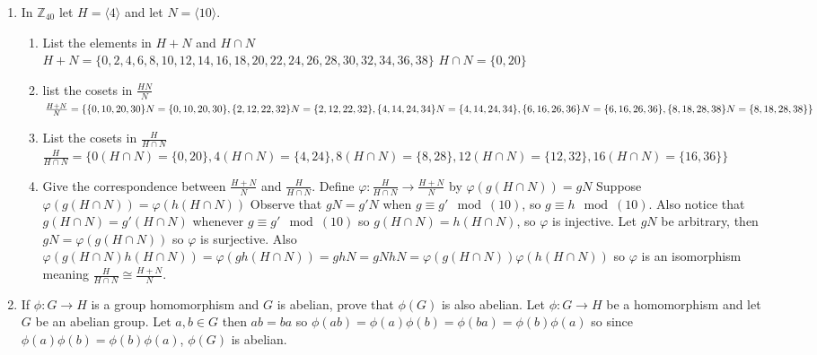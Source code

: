 \documentclass{amsart}
\begin{document}
\begin{enumerate}
    \item In $\mathbb{Z}_{40}$ let $H=\langle 4 \rangle$ and let $N=\langle 10 \rangle$.
        \begin{enumerate}
            \item
            List the elements in $H+N$ and $H\cap N$ \\
            $H+N=\{0,2,4,6,8,10,12,14,16,18,20,22,24,26,28,30,32,34,36,38\}$
            $H\cap N=\{0,20\}$
            \item
            list the cosets in $\frac{HN}{N}$ \\
            $\frac{H+N}{N}=\{\{0,10,20,30\}N=\{0,10,20,30\}, \\ \{2,12,22,32\}N= \{2,12,22,32\}, \\ \{4,14,24,34\}N=\{4,14,24,34\}, \\ \{6,16,26,36\}N=\{6,16,26,36\}, \\ \{8,18,28,38\}N=\{8,18,28,38\}\}$ \\
            \item 
            List the cosets in $\frac{H}{H\cap N}$
            $\frac{H}{H\cap N}=\{0(H\cap N)=\{0,20\}, 
            4(H\cap N)=\{4,24\}, 8(H\cap N)=\{8,28\}, 12(H\cap N)=\{12,32\}, 16(H\cap N)=\{16,36\}\}$
        \item Give the correspondence between $\frac{H+N}{N}$ and $\frac{H}{H\cap N}$. Define $\varphi:\frac{H}{H\cap N}\to \frac{H+N}{N}$ by $\varphi(g(H\cap N))=gN$  Suppose $\varphi(g(H\cap N))=\varphi(h(H\cap N))$ Observe that $gN=g'N$ when $g\equiv g' \mod(10)$, so $g\equiv h\mod(10)$.  Also notice that $g(H\cap N)=g'(H\cap N)$ whenever $g\equiv g'\mod(10)$ so $g(H\cap N)=h(H\cap N)$, so $\varphi$ is injective. Let $gN$ be arbitrary, then $gN=\varphi(g(H\cap N))$ so $\varphi$ is surjective.  Also $\varphi(g(H\cap N)h(H\cap N))=\varphi(gh(H\cap N))=ghN=gNhN=\varphi(g(H\cap N))\varphi(h(H\cap N))$ so $\varphi$ is an isomorphism meaning $\frac{H}{H\cap N}\cong \frac{H+N}{N}$.
        \end{enumerate}
    
    \item If $\phi :G\to H$ is a group homomorphism and $G$ is abelian, prove that $\phi(G)$ is also abelian. Let $\phi:G\to H$ be a homomorphism and let $G$ be an abelian group.  Let $a,b\in G$ then $ab=ba$ so $\phi(ab)=\phi(a)\phi(b)=\phi(ba)=\phi(b)\phi(a)$ so since $\phi(a)\phi(b)=\phi(b)\phi(a)$, $\phi(G)$ is abelian.


\end{enumerate}
\end{document}
